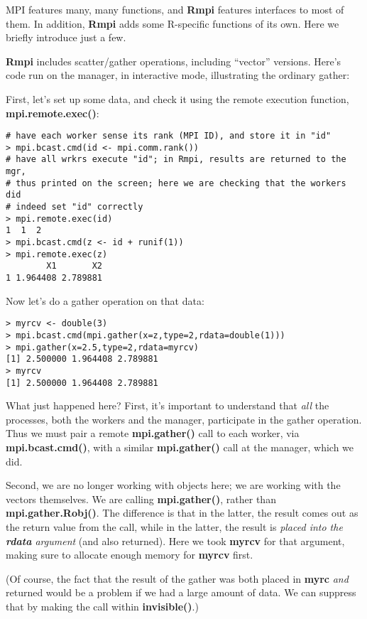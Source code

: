 MPI features many, many functions, and {\bf Rmpi} features interfaces to
most of them.  In addition, {\bf Rmpi} adds some R-specific functions of
its own.  Here we briefly introduce just a few.  

{\bf Rmpi} includes scatter/gather operations, including ``vector''
versions.  Here's code run on the manager, in interactive mode,
illustrating the ordinary gather:

First, let's set up some data, and check it using the remote execution
function, {\bf mpi.remote.exec()}:
\begin{lstlisting}
# have each worker sense its rank (MPI ID), and store it in "id"
> mpi.bcast.cmd(id <- mpi.comm.rank())  
# have all wrkrs execute "id"; in Rmpi, results are returned to the mgr,
# thus printed on the screen; here we are checking that the workers did
# indeed set "id" correctly
> mpi.remote.exec(id)  
1  1  2
> mpi.bcast.cmd(z <- id + runif(1))
> mpi.remote.exec(z)
        X1       X2
1 1.964408 2.789881
\end{lstlisting}

Now let's do a gather operation on that data:

\begin{lstlisting}
> myrcv <- double(3)
> mpi.bcast.cmd(mpi.gather(x=z,type=2,rdata=double(1)))
> mpi.gather(x=2.5,type=2,rdata=myrcv)
[1] 2.500000 1.964408 2.789881
> myrcv
[1] 2.500000 1.964408 2.789881
\end{lstlisting}

What just happened here?  First, it's important to understand that {\it
all} the processes, both the workers and the manager, participate in the
gather operation.  Thus we must pair a remote {\bf mpi.gather()} call to
each worker, via {\bf mpi.bcast.cmd()}, with a similar {\bf
mpi.gather()} call at the manager, which we did.

Second, we are no longer working with objects here; we are working with
the vectors themselves.  We are calling {\bf mpi.gather()}, rather than
{\bf mpi.gather.Robj()}.  The difference is that in the latter, the
result comes out as the return value from the call, while in the latter,
the result is {\it placed into the {\bf rdata} argument} (and also
returned).  Here we took {\bf myrcv} for that argument, making sure to
allocate enough memory for {\bf myrcv} first.  

(Of course, the fact that the result of the gather was both placed in
{\bf myrc} {\it and} returned would be a problem if we had a large
amount of data.  We can suppress that by making the call within {\bf
invisible()}.)

